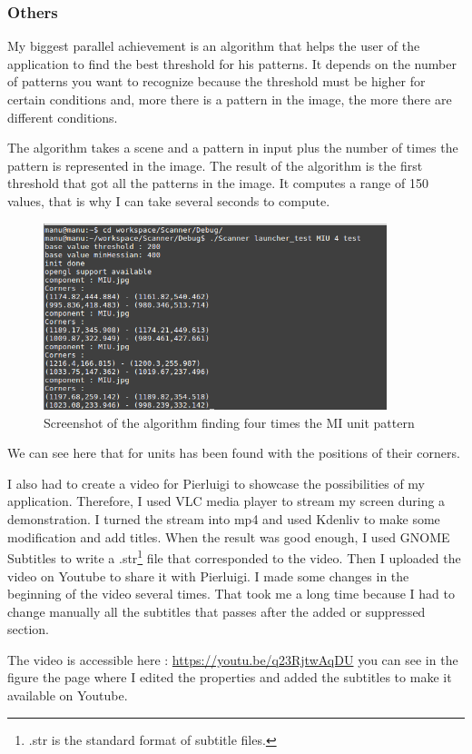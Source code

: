 	\subsubsection{Others}
	
	\par My biggest parallel achievement is an algorithm that helps the user of the application to find the best threshold for his patterns. It depends on the number of patterns you want to recognize because the threshold must be higher for certain conditions and, more there is a pattern in the image, the more there are different conditions. 
	\par The algorithm takes a scene and a pattern in input plus the number of times the pattern is represented in the image. The result of the algorithm is the first threshold that got all the patterns in the image. It computes a range of 150 values, that is why I can take several seconds to compute.
	
	\begin{figure}[h]
		\begin{center}
			\includegraphics[width=10cm]{images_not_compressed/tester.png}
			\caption{Screenshot of the algorithm finding four times the MI unit pattern}
		\end{center}
	\end{figure}	
	
	\par We can see here that for units has been found with the positions of their corners.
	
	\par I also had to create a video for Pierluigi to showcase the possibilities of my application. Therefore, I used VLC media player to stream my screen during a demonstration. I turned the stream into mp4 and used Kdenliv to make some modification and add titles. When the result was good enough, I used GNOME Subtitles to write a .str\footnote{.str is the standard format of subtitle files.} file that corresponded to the video. Then I uploaded the video on Youtube to share it with Pierluigi. I made some changes in the beginning of the video several times. That took me a long time because I had to change manually all the subtitles that passes after the added or suppressed section.
	\par The video is accessible here : \url{https://youtu.be/q23RjtwAqDU} you can see in the figure the page where I edited the properties and added the subtitles to make it available on Youtube.
